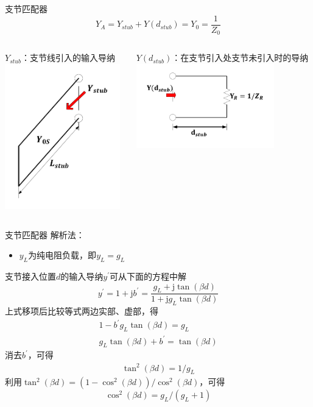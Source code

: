 \begin{frame}{支节匹配器}
  $$Y_A=Y_{stub}+Y(d_{stub})=Y_0=\frac{1}{Z_0}$$
  \begin{columns}
    \begin{column}{0.5\linewidth}
      $Y_{stub}$：支节线引入的输入导纳\\
      \includegraphics[width=5cm]{fig4-25.pdf}
    \end{column}
    \begin{column}{0.5\linewidth}
      $Y(d_{stub})$：在支节引入处支节未引入时的导纳\\
      \includegraphics[width=6cm]{fig4-26.pdf}
    \end{column}
  \end{columns}
\end{frame}

\begin{frame}{支节匹配器}
  解析法：
  \begin{itemize}
    \item $y_L$为纯电阻负载，即$y_L=g_L$
  \end{itemize}
  支节接入位置$d$的输入导纳$y^{'}$可从下面的方程中解
  $$y^{'}=1+\mathrm{j}b^{'}=\frac{g_L+\mathrm{j}\tan(\beta d)}{1+\mathrm{j}g_L\tan(\beta d)}$$
  上式移项后比较等式两边实部、虚部，得
  \begin{align}
    1-b^{'}g_L\tan(\beta d)=g_L \\
    g_L\tan(\beta d)+b^{'}=\tan(\beta d) \label{eqn4-1}
  \end{align}
  消去$b^{'}$，可得
  \begin{align}
    \tan^2(\beta d)=1/g_L \label{eqn4-2}
  \end{align}
  利用$\tan^2(\beta d)=(1-\cos^2(\beta d))/\cos^2(\beta d)$，可得
  $$\cos^2(\beta d)=g_L/(g_L+1)$$
\end{frame}

